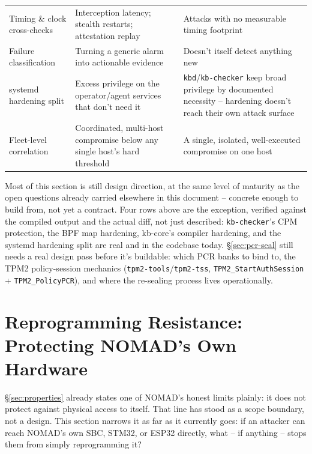 \documentclass[11pt,a4paper]{article}
\begin{document}
\begin{center}
\begin{tabular}{@{}p{3.3cm}p{5.6cm}p{4.1cm}@{}}
Timing \& clock cross-checks & Interception latency; stealth restarts;
attestation replay & Attacks with no measurable timing footprint \\
Failure classification & Turning a generic alarm into actionable
evidence & Doesn't itself detect anything new \\
systemd hardening split & Excess privilege on the operator/agent
services that don't need it & \texttt{kbd}/\texttt{kb-checker} keep
broad privilege by documented necessity -- hardening doesn't reach
their own attack surface \\
Fleet-level correlation & Coordinated, multi-host compromise below any
single host's hard threshold & A single, isolated, well-executed
compromise on one host \\
\bottomrule
\end{tabular}
\end{center}

\begin{notebox}[Status]
Most of this section is still design direction, at the same level of
maturity as the open questions already carried elsewhere in this
document -- concrete enough to build from, not yet a contract. Four
rows above are the exception, verified against the compiled output and
the actual diff, not just described: \texttt{kb-checker}'s CPM
protection, the BPF map hardening, kb-core's compiler hardening, and
the systemd hardening split are real and in the codebase today.
\S\ref{sec:pcr-seal} still needs a real design pass before it's
buildable: which PCR banks to bind to, the TPM2 policy-session
mechanics (\texttt{tpm2-tools}/\texttt{tpm2-tss},
\texttt{TPM2\_StartAuthSession} + \texttt{TPM2\_PolicyPCR}), and where
the re-sealing process lives operationally.
\end{notebox}

\section{Reprogramming Resistance: Protecting NOMAD's Own Hardware}
\label{sec:reprogram}

\S\ref{sec:properties} already states one of NOMAD's honest limits
plainly: it does not protect against physical access to itself. That
line has stood as a scope boundary, not a design. This section narrows
it as far as it currently goes: if an attacker can reach NOMAD's own
SBC, STM32, or ESP32 directly, what -- if anything -- stops them from
simply reprogramming it?
\end{document}
